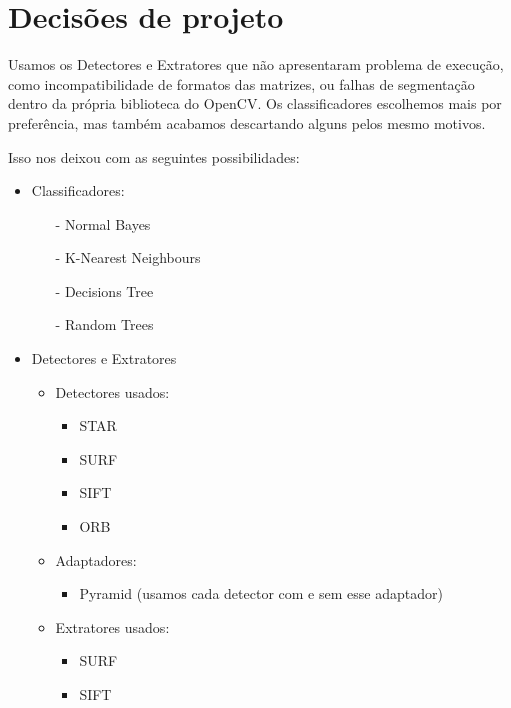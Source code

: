 \documentclass[a4paper,11pt]{article}
\begin{document}
\section{Decisões de projeto}

  Usamos os Detectores e Extratores que não apresentaram problema de execução,
  como incompatibilidade de formatos das matrizes, ou falhas de segmentação
  dentro da própria biblioteca do OpenCV. Os classificadores escolhemos mais
  por preferência, mas também acabamos descartando alguns pelos mesmo motivos.  

  Isso nos deixou com as seguintes possibilidades:

  \begin{itemize}
    \item Classificadores:
    \begin{itemize}
      \item[-] Normal Bayes
      \item[-] K-Nearest Neighbours
      \item[-] Decisions Tree
      \item[-] Random Trees
    \end{itemize}
    
    \item Detectores e Extratores
      \begin{itemize}
        \item Detectores usados:
          \begin{itemize}
            \item STAR
            \item SURF
            \item SIFT
            \item ORB\footnotemark
          \end{itemize}
  
        \item Adaptadores:
          \begin{itemize} 
            \item Pyramid (usamos cada detector com e sem esse adaptador)
          \end{itemize}
  
        \item Extratores usados:
          \begin{itemize} 
            \item SURF
            \item SIFT
          \end{itemize}
  
      \end{itemize}
  
  \end{itemize}
  
\end{document}
